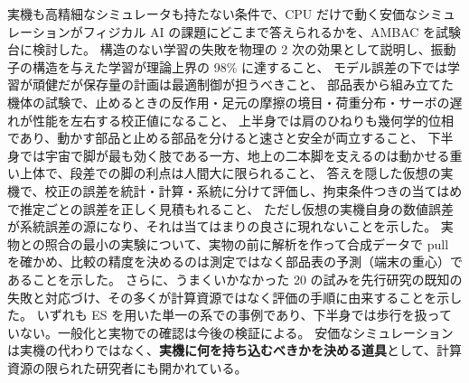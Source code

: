 \documentclass[paper=a4paper,fontsize=10pt,twocolumn,column_gap=2zw,line_length=24zw,number_of_lines=46,head_space=20mm]{jlreq}
\begin{document}
実機も高精細なシミュレータも持たない条件で、CPU だけで動く安価なシミュレーションがフィジカル AI の課題にどこまで答えられるかを、AMBAC を試験台に検討した。
構造のない学習の失敗を物理の 2 次の効果として説明し、振動子の構造を与えた学習が理論上界の 98\% に達すること、
モデル誤差の下では学習が頑健だが保存量の計画は最適制御が担うべきこと、
部品表から組み立てた機体の試験で、止めるときの反作用・足元の摩擦の境目・荷重分布・サーボの遅れが性能を左右する校正値になること、
上半身では肩のひねりも幾何学的位相であり、動かす部品と止める部品を分けると速さと安全が両立すること、
下半身では宇宙で脚が最も効く肢である一方、地上の二本脚を支えるのは動かせる重い上体で、段差での脚の利点は人間大に限られること、
答えを隠した仮想の実機で、校正の誤差を統計・計算・系統に分けて評価し、拘束条件つきの当てはめで推定ごとの誤差を正しく見積もれること、
ただし仮想の実機自身の数値誤差が系統誤差の源になり、それは当てはまりの良さに現れないことを示した。
実物との照合の最小の実験について、実物の前に解析を作って合成データで pull を確かめ、比較の精度を決めるのは測定ではなく部品表の予測（端末の重心）であることを示した。
さらに、うまくいかなかった 20 の試みを先行研究の既知の失敗と対応づけ、その多くが計算資源ではなく評価の手順に由来することを示した。
いずれも ES を用いた単一の系での事例であり、下半身では歩行を扱っていない。一般化と実物での確認は今後の検証による。
安価なシミュレーションは実機の代わりではなく、\textbf{実機に何を持ち込むべきかを決める道具}として、計算資源の限られた研究者にも開かれている。

\appendix
\end{document}
